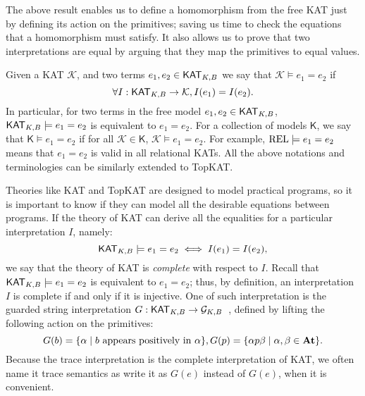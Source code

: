 The above result enables us to define a homomorphism from the free KAT just by
defining its action on the primitives; saving us time to check the equations
that a homomorphism must satisfy.  It also allows us to prove that two
interpretations are equal by arguing that they map the primitives to
equal values.

Given a KAT \(\mathcal{K}\), and two terms \(e_1, e_2  \in  \mathsf{KAT}_{K, B}\) we say that \(\mathcal{K}  \models  e_1 = e_2\) if
\[ \forall  I : \mathsf{KAT}_{K, B}  \to  \mathcal{K}, I(e_1) = I(e_2).\] In particular, 
for two terms in the free model \(e_1, e_2  \in  \mathsf{KAT}_{K, B}\),
\(\mathsf{KAT}_{K, B}  \models  e_1 = e_2\) is equivalent to \(e_1 = e_2\).  
For a collection of models \(\mathsf{K}\), 
we say that \(\mathsf{K}  \models  e_1 = e_2\) if for all \(\mathcal{K}  \in  \mathsf{K}\),
\(\mathcal{K}  \models  e_1 = e_2\).  For example, \(\mathbf{\mathrm{REL}}  \models  e_1 = e_2\) means that \(e_1 = e_2\) is
valid in all relational KATs.  All the above notations and terminologies can be
similarly extended to TopKAT.

Theories like KAT and TopKAT are designed to model practical
programs, so it is important to know if they can model all the desirable
equations between programs. If the theory of KAT can derive all the equalities
for a particular interpretation \(I\), namely:
\[\mathsf{KAT}_{K, B}  \models  e_1 = e_2  \iff  I(e_1) = I(e_2),\]
we say that the theory of KAT is \emph{complete} with respect to \(I\).
Recall that \(\mathsf{KAT}_{K, B}  \models  e_1 = e_2\) is equivalent to \(e_1 = e_2\);  
thus, by definition, an interpretation \(I\) is complete if and only if it is injective.
One of such interpretation is the guarded string interpretation
\(G: \mathsf{KAT}_{K, B}  \to  \mathcal{G}_{K, B}\)~\cite{Kozen_Smith_1997},
defined by lifting the following action on the primitives:
\[
    G(b) = \{ \alpha   \mid  \text{\(b\) appears positively in \( \alpha \)}\}, \\
    G(p) = \{ \alpha  p  \beta   \mid   \alpha ,  \beta   \in  \mathbf{At}\}.
\]
Because the trace interpretation is the complete interpretation of KAT, we often name it trace semantics as write it as \(G(e)\) instead of \(G(e)\), when it is convenient.



